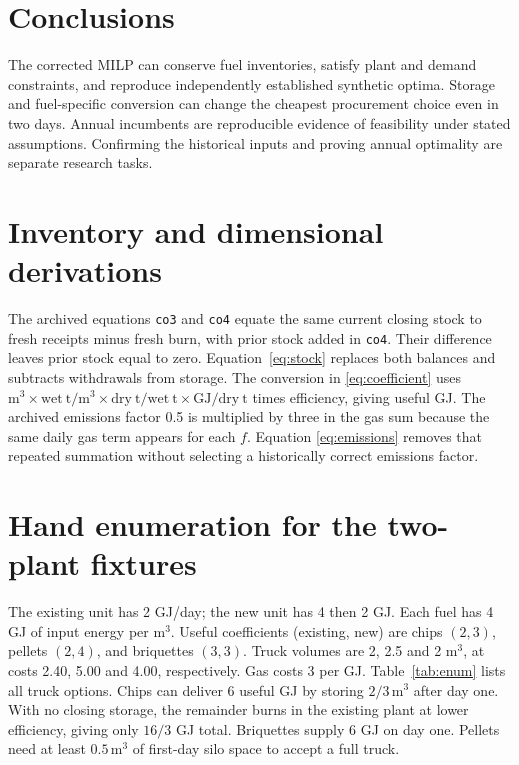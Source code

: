 \documentclass[11pt,a4paper]{article}
\begin{document}
\section{Conclusions}
The corrected MILP can conserve fuel inventories, satisfy plant and demand
constraints, and reproduce independently established synthetic optima.
Storage and fuel-specific conversion can change the cheapest procurement
choice even in two days. Annual incumbents are reproducible evidence of
feasibility under stated assumptions. Confirming the historical inputs
and proving annual optimality are separate research tasks.


\begingroup
\raggedright

\endgroup

\appendix
\small
\section{Inventory and dimensional derivations}
The archived equations \texttt{co3} and \texttt{co4} equate the same
current closing stock to fresh receipts minus fresh burn, with prior stock
added in \texttt{co4}. Their difference leaves prior stock equal to zero.
Equation~\eqref{eq:stock} replaces both balances and subtracts withdrawals
from storage. The conversion in \eqref{eq:coefficient} uses
\(\mathrm{m^3}\times \mathrm{wet\ t/m^3}\times
\mathrm{dry\ t/wet\ t}\times\mathrm{GJ/dry\ t}\) times efficiency, giving
useful GJ. The archived emissions factor 0.5 is multiplied by three in the
gas sum because the same daily gas term appears for each \(f\). Equation
\eqref{eq:emissions} removes that repeated summation without selecting a
historically correct emissions factor.

\section{Hand enumeration for the two-plant fixtures}\label{app:enumeration}
The existing unit has 2 GJ/day; the new unit has 4 then 2 GJ. Each fuel
has 4 GJ of input energy per \(\mathrm{m^3}\). Useful coefficients
(existing, new) are chips \((2,3)\), pellets \((2,4)\), and briquettes
\((3,3)\). Truck volumes are 2, 2.5 and 2 \(\mathrm{m^3}\), at costs
2.40, 5.00 and 4.00, respectively. Gas costs 3 per GJ.
Table~\ref{tab:enum} lists all truck options. Chips can deliver 6 useful
GJ by storing \(2/3\,\mathrm{m^3}\) after day one. With no closing storage,
the remainder burns in the existing plant at lower efficiency, giving only
\(16/3\) GJ total. Briquettes supply 6 GJ on day one. Pellets need at least
\(0.5\,\mathrm{m^3}\) of first-day silo space to accept a full truck.
\end{document}
